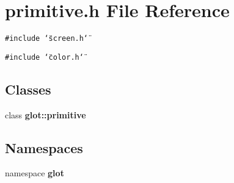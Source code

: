 \section{primitive.h File Reference}
\label{primitive_8h}
{\tt \#include \char`\"{}screen.h\char`\"{}}\par
{\tt \#include \char`\"{}color.h\char`\"{}}\par
\subsection*{Classes}
\begin{CompactItemize}
\item 
class {\bf glot::primitive}
\end{CompactItemize}
\subsection*{Namespaces}
\begin{CompactItemize}
\item 
namespace {\bf glot}
\end{CompactItemize}
